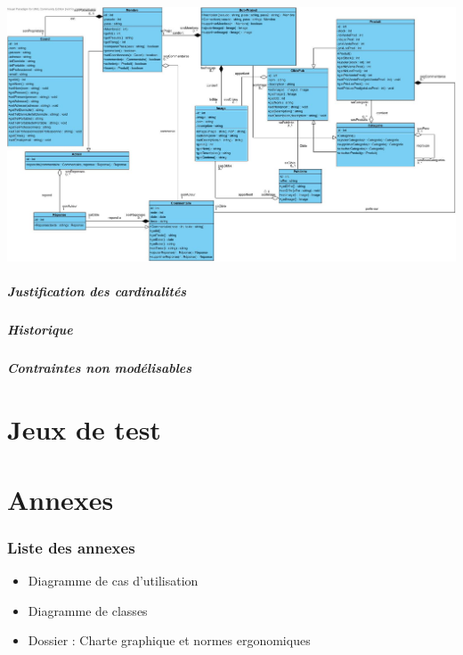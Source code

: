 \documentclass[10pt,a4paper]{article}
\begin{document}
					\includegraphics[scale=0.2]{donnees/classes.jpg}
				\subsubsection{Justification des cardinalités}
					
				\subsubsection{Historique}
					
				\subsubsection{Contraintes non modélisables}
					
	\newpage
	\part{Jeux de test}
		
	\newpage
	\part{Annexes}
		\section{Liste des annexes}
		\begin{itemize}
			\item Diagramme de cas d'utilisation
			\item Diagramme de classes
			\item Dossier : Charte graphique et normes ergonomiques
		\end{itemize}
\end{document}
